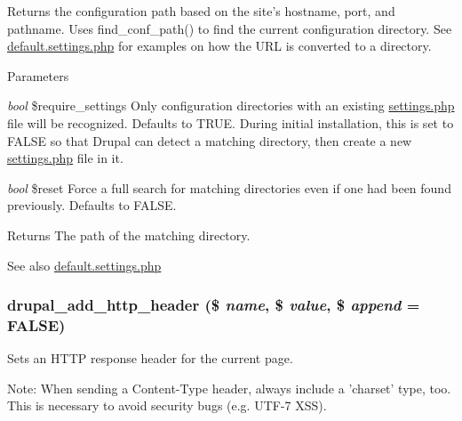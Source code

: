 Returns the configuration path based on the site's hostname, port, and pathname. Uses find\_\-conf\_\-path() to find the current configuration directory. See \hyperlink{default_8settings_8php}{default.settings.php} for examples on how the URL is converted to a directory.


\begin{DoxyParams}{Parameters}
\item[{\em bool}]\$require\_\-settings Only configuration directories with an existing \hyperlink{settings_8php}{settings.php} file will be recognized. Defaults to TRUE. During initial installation, this is set to FALSE so that Drupal can detect a matching directory, then create a new \hyperlink{settings_8php}{settings.php} file in it. \item[{\em bool}]\$reset Force a full search for matching directories even if one had been found previously. Defaults to FALSE.\end{DoxyParams}
\begin{DoxyReturn}{Returns}
The path of the matching directory.
\end{DoxyReturn}
\begin{DoxySeeAlso}{See also}
\hyperlink{default_8settings_8php}{default.settings.php} 
\end{DoxySeeAlso}
\hypertarget{bootstrap_8inc_ad4ff2b2cf5a2fb632c2c869bc1a5a70f}{
\subsubsection[{drupal\_\-add\_\-http\_\-header}]{\setlength{\rightskip}{0pt plus 5cm}drupal\_\-add\_\-http\_\-header (\$ {\em name}, \/  \$ {\em value}, \/  \$ {\em append} = {\ttfamily FALSE})}}
\label{bootstrap_8inc_ad4ff2b2cf5a2fb632c2c869bc1a5a70f}
Sets an HTTP response header for the current page.

Note: When sending a Content-\/Type header, always include a 'charset' type, too. This is necessary to avoid security bugs (e.g. UTF-\/7 XSS).


